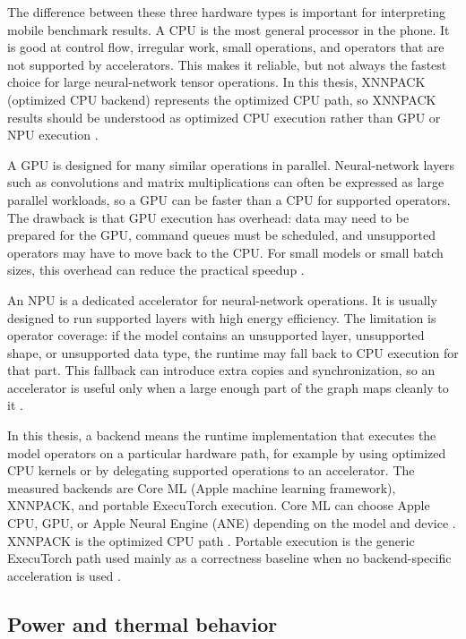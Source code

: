 The difference between these three hardware types is important for interpreting
mobile benchmark results. A CPU is the most general
processor in the phone. It is good at control flow, irregular work, small
operations, and operators that are not supported by accelerators. This makes it
reliable, but not always the fastest choice for large neural-network tensor
operations. In this thesis, XNNPACK (optimized CPU backend) represents the
optimized CPU path, so XNNPACK results should be understood as optimized CPU
execution rather than GPU or NPU execution \cite{executorch_xnnpack,xnnpack_repo}.

A GPU is designed for many similar operations in
parallel. Neural-network layers such as convolutions and matrix multiplications
can often be expressed as large parallel workloads, so a GPU can be faster than
a CPU for supported operators. The drawback is that GPU execution has overhead:
data may need to be prepared for the GPU, command queues must be scheduled, and
unsupported operators may have to move back to the CPU. For small models or
small batch sizes, this overhead can reduce the practical speedup
\cite{lee2019mobilegpu,li2024mobilebenchmark}.

An NPU is a dedicated accelerator for neural-network
operations. It is usually designed to run supported layers with high energy
efficiency. The limitation is operator coverage: if the model contains an
unsupported layer, unsupported shape, or unsupported data type, the runtime may
fall back to CPU execution for that part. This fallback can introduce extra
copies and synchronization, so an accelerator is useful only when a large enough
part of the graph maps cleanly to it \cite{wang2020mobilesoc,reddi2022mlperfmobile}.

In this thesis, a backend means the runtime implementation that executes the
model operators on a particular hardware path, for example by using optimized CPU
kernels or by delegating supported operations to an accelerator. The measured
backends are Core ML (Apple machine learning framework), XNNPACK, and portable
ExecuTorch execution.
Core ML can choose Apple CPU, GPU, or Apple Neural Engine (ANE) depending on the model and device
\cite{apple_coreml,executorch_coreml}. XNNPACK is the optimized CPU path
\cite{executorch_xnnpack}. Portable execution is the generic ExecuTorch path
used mainly as a correctness baseline when no backend-specific acceleration is
used \cite{executorch_how,executorch_arch}.

\subsection{Power and thermal behavior}

